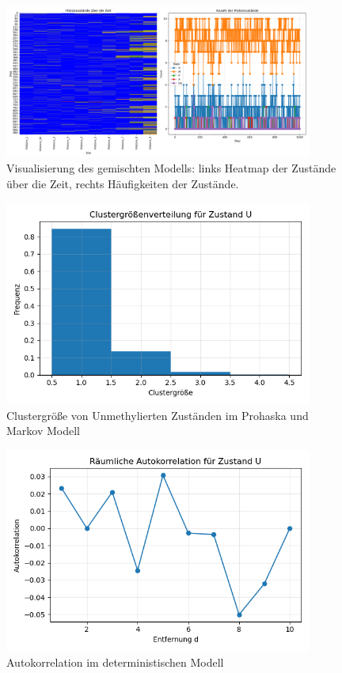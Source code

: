 \documentclass{SeminarV2}
\begin{document}
\begin{figure}[htbp]
  \centering
  \includegraphics[width=0.9\textwidth]{images/Histone_Prohaska_and_Markov_1000.png}
  \caption{Visualisierung des gemischten Modells: links Heatmap der Zustände über die Zeit, rechts Häufigkeiten der Zustände.}
  \label{fig:PM_1000}
\end{figure}

\begin{figure} [htbp]
  \centering
  \includegraphics[width=0.9\textwidth]{images/Histone_Prohaska_and_Markov_1000_cluster.png}
  \caption{Clustergröße von Unmethylierten Zuständen im Prohaska und Markov Modell}
  \label{fig:PM_1000_C}
  \end{figure}

\begin{figure}
  \centering
  \includegraphics[width=0.9\textwidth]{images/Histone_Prohaska_and_Markov_1000_Autokorrelation.png}
  \caption{Autokorrelation im deterministischen Modell}
  \label{fig:PM_1000_A}
\end{figure}


\begin{footnotesize}
\newpage


\end{footnotesize}
\end{document}

